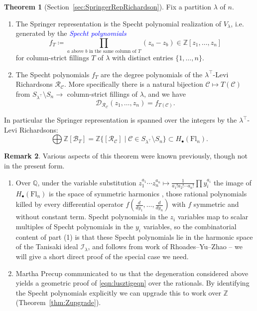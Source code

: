 \documentclass[11pt]{amsart}
\theoremstyle{definition}
\newtheorem{thm}{Theorem}[section]
\newtheorem{rem}[thm]{Remark}
\numberwithin{equation}{section}
\newcommand{\suchthat}{\;|\;}
\newcommand{\fl}[1]{\mathrm{Fl}_{#1}}
\renewcommand\emph[1]{\textcolor{blue}{\textit{#1}}} %
\begin{document}
\begin{thm}[{Section~\ref{sec:SpringerRepRichardson}}]
\label{thm:introSpecht}
Fix a partition $\lambda$ of $n$.
\begin{enumerate}
    \item The Springer representation is the Specht polynomial realization of $V_\lambda$, i.e. generated by the \emph{Specht polynomials} $$f_T\coloneqq \prod_{a\text{ above $b$ in the same column of }T} (z_a-z_b)\in \mathbb{Z}[z_1,\ldots,z_n]$$
    for column-strict fillings $T$ of $\lambda$ with distinct entries $\{1,\ldots,n\}$.
    \item The Specht polynomials $f_T$ are the degree polynomials of the $\lambda^{\top}$-Levi Richardsons  $\mathcal{R}_{\mathcal{C}}$.
    More specifically there is a natural bijection  $\mathcal{C}\mapsto T(\mathcal{C})$ from $S_{\lambda^{\top}}\setminus S_n\to $ column-strict fillings of $\lambda$, and we have
    $$\mathcal{D}_{\mathcal{R}_{\mathcal{C}}}(z_1,\ldots,z_n)=f_{T(\mathcal{C})}.$$
\end{enumerate}
In particular the Springer representation is spanned over the integers by the $\lambda^{\top}$-Levi Richardsons:
\begin{equation}
\label{eqn:lusztigeqn}
\bigoplus \mathbb{Z}[\mathcal{B}_T]=\mathbb{Z}\{[\mathcal{R}_{\mathcal{C}}]\suchthat \mathcal{C}\in S_{\lambda^{\top}}\setminus S_n\}\subset H_\bullet(\fl{n}).\end{equation}
\end{thm}

\begin{rem}
Various aspects of this theorem were known previously, though not in the present form.
    \begin{enumerate}
        \item[(a)] Over $\mathbb{Q}$, under the variable substitution $z_1^{a_1}\cdots z_n^{a_n}\mapsto \frac{1}{a_1!a_2!\cdots a_n!}\prod y_i^{a_i}$ the image of $H_\bullet(\fl{n})$  is the space of symmetric harmonics \cite[Theorem~3.13]{BGG73}, those rational polynomials killed by every differential operator $f(\frac{d}{dy_1},\ldots,\frac{d}{dy_n})$ with $f$ symmetric and without constant term.
        Specht polynomials in the $z_i$ variables map to scalar multiples of Specht polynomials in the $y_i$ variables, so the combinatorial content of part (1) is that these Specht polynomials lie in the harmonic space of the Tanisaki ideal $\mathcal{I}_\lambda$, and follows from work of Rhoades--Yu--Zhao \cite[Lemma 11]{RYZ20} -- we will give a short direct proof of the special case we need.
        \item[(b)]  Martha Precup \cite{MarthaPriv} communicated to us that the degeneration considered above yields a geometric proof of \eqref{eqn:lusztigeqn} over the rationals.
        By identifying the Specht polynomials explicitly we can upgrade this to work over $\mathbb{Z}$ (Theorem~\ref{thm:Zupgrade}).
    \end{enumerate}
\end{rem}
\end{document}
